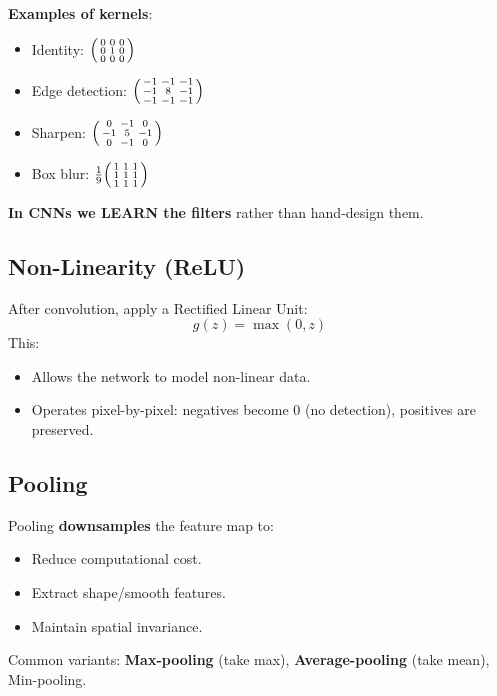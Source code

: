 \documentclass[11pt,a4paper]{article}
\begin{document}
\textbf{Examples of kernels}:
\begin{itemize}[leftmargin=*]
    \item Identity: $\begin{psmallmatrix}0&0&0\\0&1&0\\0&0&0\end{psmallmatrix}$
    \item Edge detection: $\begin{psmallmatrix}-1&-1&-1\\-1&8&-1\\-1&-1&-1\end{psmallmatrix}$
    \item Sharpen: $\begin{psmallmatrix}0&-1&0\\-1&5&-1\\0&-1&0\end{psmallmatrix}$
    \item Box blur: $\tfrac{1}{9}\begin{psmallmatrix}1&1&1\\1&1&1\\1&1&1\end{psmallmatrix}$
\end{itemize}

\textbf{In CNNs we LEARN the filters} rather than hand-design them.

\subsection{Non-Linearity (ReLU)}

After convolution, apply a Rectified Linear Unit:
\[
g(z) = \max(0, z)
\]
This:
\begin{itemize}[leftmargin=*]
    \item Allows the network to model non-linear data.
    \item Operates pixel-by-pixel: negatives become 0 (no detection), positives are preserved.
\end{itemize}

\subsection{Pooling}

\begin{definitionbox}[title=Pooling]
Pooling \textbf{downsamples} the feature map to:
\begin{itemize}[leftmargin=*]
    \item Reduce computational cost.
    \item Extract shape/smooth features.
    \item Maintain spatial invariance.
\end{itemize}
Common variants: \textbf{Max-pooling} (take max), \textbf{Average-pooling} (take mean), Min-pooling.
\end{definitionbox}
\end{document}
